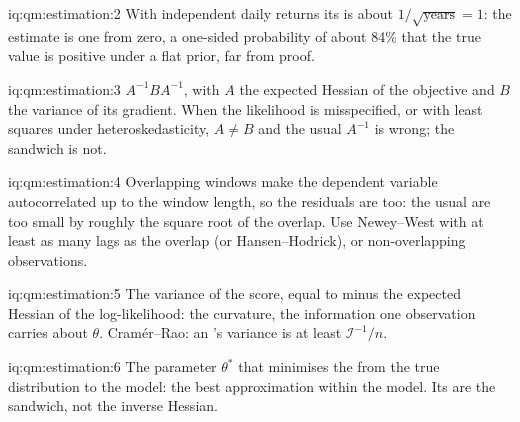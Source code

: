 \begin{solution}{iq:qm:estimation:2}
With independent daily returns its  is about $1/\sqrt{\text{years}} = 1$: the estimate is one  from
zero, a one-sided probability of about 84\% that the true value is positive under a flat prior, far from proof.
\end{solution}

\begin{solution}{iq:qm:estimation:3}
$A^{-1}BA^{-1}$, with $A$ the expected Hessian of the objective and $B$ the variance of its gradient. When the likelihood is
misspecified, or with least squares under heteroskedasticity, $A \ne B$ and the usual $A^{-1}$ is wrong; the sandwich is not.
\end{solution}

\begin{solution}{iq:qm:estimation:4}
Overlapping windows make the dependent variable autocorrelated up to the window length, so the residuals are too: the usual
 are too small by roughly the square root of the overlap. Use Newey--West with at least as many lags as the
overlap (or Hansen--Hodrick), or non-overlapping observations.
\end{solution}

\begin{solution}{iq:qm:estimation:5}
The variance of the score, equal to minus the expected Hessian of the log-likelihood: the curvature, the information one
observation carries about $\theta$. Cramér--Rao: an 's variance is at least $\mathcal I^{-1}/n$.
\end{solution}

\begin{solution}{iq:qm:estimation:6}
The parameter $\theta^*$ that minimises the  from the true distribution to the model: the best
approximation within the model. Its  are the sandwich, not the inverse Hessian.
\end{solution}

